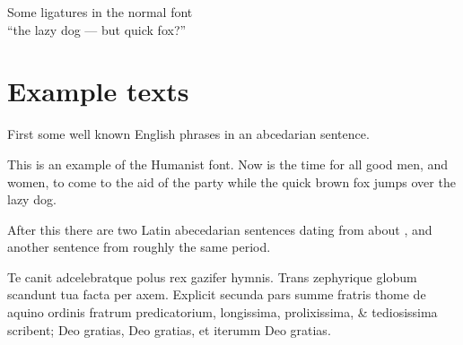 \documentclass{article}
\newcommand{\Romannum}[1]{\uppercase\expandafter{\romannumeral #1}}
\newcommand{\Sentence}{%
This is an example of the Humanist font. Now is the time for all good
men, and women, to come to the aid of the party while the quick brown fox
jumps over the lazy dog.}
\newcommand{\latin}{Te canit adcelebratque polus rex gazifer hymnis.
  Trans zephyrique globum scandunt tua facta per axem.
  Explicit secunda pars summe fratris thome de aquino ordinis fratrum 
  predicatorium, longissima, prolixissima, \& tediosissima scribent;
  Deo gratias, Deo gratias, et iterumm Deo gratias. }
\begin{document}
\begin{center}
    Some ligatures in the normal font \\
{``the lazy dog --- but quick fox?''}
\end{center}

\section{Example texts}

    First some well known English phrases in an abcedarian sentence.

\Sentence{}

    After this there are two Latin abecedarian sentences dating from about 
\Romannum{790}, and another sentence from roughly the same period.

\latin{}

    
\end{document}
